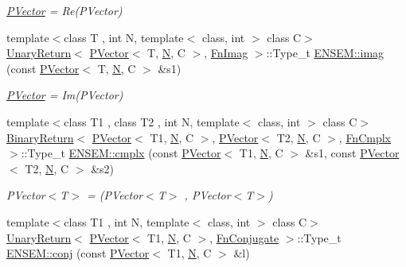 \begin{DoxyCompactItemize}
\begin{DoxyCompactList}\small\item\em \mbox{\hyperlink{classENSEM_1_1PVector}{P\+Vector}} = Re(\+P\+Vector) \end{DoxyCompactList}\item 
{\footnotesize template$<$class T , int N, template$<$ class, int $>$ class C$>$ }\\\mbox{\hyperlink{structENSEM_1_1UnaryReturn}{Unary\+Return}}$<$ \mbox{\hyperlink{classENSEM_1_1PVector}{P\+Vector}}$<$ T, \mbox{\hyperlink{operator__name__util_8cc_a7722c8ecbb62d99aee7ce68b1752f337}{N}}, C $>$, \mbox{\hyperlink{structENSEM_1_1FnImag}{Fn\+Imag}} $>$\+::Type\+\_\+t \mbox{\hyperlink{group__primvector_ga29974958f6885a4267cae10b6bec2344}{E\+N\+S\+E\+M\+::imag}} (const \mbox{\hyperlink{classENSEM_1_1PVector}{P\+Vector}}$<$ T, \mbox{\hyperlink{operator__name__util_8cc_a7722c8ecbb62d99aee7ce68b1752f337}{N}}, C $>$ \&s1)
\begin{DoxyCompactList}\small\item\em \mbox{\hyperlink{classENSEM_1_1PVector}{P\+Vector}} = Im(\+P\+Vector) \end{DoxyCompactList}\item 
{\footnotesize template$<$class T1 , class T2 , int N, template$<$ class, int $>$ class C$>$ }\\\mbox{\hyperlink{structENSEM_1_1BinaryReturn}{Binary\+Return}}$<$ \mbox{\hyperlink{classENSEM_1_1PVector}{P\+Vector}}$<$ T1, \mbox{\hyperlink{operator__name__util_8cc_a7722c8ecbb62d99aee7ce68b1752f337}{N}}, C $>$, \mbox{\hyperlink{classENSEM_1_1PVector}{P\+Vector}}$<$ T2, \mbox{\hyperlink{operator__name__util_8cc_a7722c8ecbb62d99aee7ce68b1752f337}{N}}, C $>$, \mbox{\hyperlink{structENSEM_1_1FnCmplx}{Fn\+Cmplx}} $>$\+::Type\+\_\+t \mbox{\hyperlink{group__primvector_ga4b7fc81e0d4329f6c328adee1c9daf7e}{E\+N\+S\+E\+M\+::cmplx}} (const \mbox{\hyperlink{classENSEM_1_1PVector}{P\+Vector}}$<$ T1, \mbox{\hyperlink{operator__name__util_8cc_a7722c8ecbb62d99aee7ce68b1752f337}{N}}, C $>$ \&s1, const \mbox{\hyperlink{classENSEM_1_1PVector}{P\+Vector}}$<$ T2, \mbox{\hyperlink{operator__name__util_8cc_a7722c8ecbb62d99aee7ce68b1752f337}{N}}, C $>$ \&s2)
\begin{DoxyCompactList}\small\item\em P\+Vector$<$\+T$>$ = (P\+Vector$<$\+T$>$ , P\+Vector$<$\+T$>$) \end{DoxyCompactList}\item 
{\footnotesize template$<$class T1 , int N, template$<$ class, int $>$ class C$>$ }\\\mbox{\hyperlink{structENSEM_1_1UnaryReturn}{Unary\+Return}}$<$ \mbox{\hyperlink{classENSEM_1_1PVector}{P\+Vector}}$<$ T1, \mbox{\hyperlink{operator__name__util_8cc_a7722c8ecbb62d99aee7ce68b1752f337}{N}}, C $>$, \mbox{\hyperlink{structENSEM_1_1FnConjugate}{Fn\+Conjugate}} $>$\+::Type\+\_\+t \mbox{\hyperlink{group__primvector_gaf0e85ba33a2d6040ed1d0e3869ae7818}{E\+N\+S\+E\+M\+::conj}} (const \mbox{\hyperlink{classENSEM_1_1PVector}{P\+Vector}}$<$ T1, \mbox{\hyperlink{operator__name__util_8cc_a7722c8ecbb62d99aee7ce68b1752f337}{N}}, C $>$ \&l)

\end{DoxyCompactItemize}
